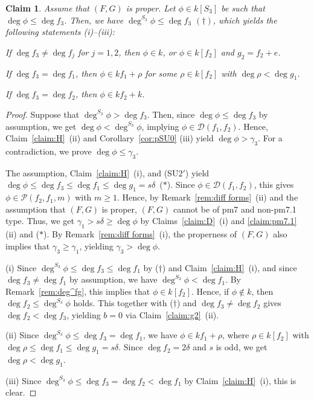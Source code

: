 \documentclass{amsart}
\theoremstyle{plain}
\newtheorem{claim}{Claim}
\theoremstyle{definition}
\newcommand{\nd}{\noindent}
\begin{document}
\begin{claim}\label{claim:S3}
Assume that $(F,G)$ is proper. 
Let $\phi \in k[S_3]$ be such that $\deg \phi \le \deg f_3$. 
Then, we have $\deg ^{S_3}\phi \le \deg f_3$ $(\dag )$, 
which yields the following statements 
{\rm (i)}--{\rm (iii):} 



\nd{\rm (i)} If $\deg f_3\ne \deg f_j$ for $j=1,2$, 
then $\phi \in k$, or 
$\phi \in k[f_2]$ and $g_2=f_2+e$. 


\nd{\rm (ii)} If $\deg f_3=\deg f_1$, 
then $\phi \in kf_1+\rho $ 
for some $\rho \in k[f_2]$ with $\deg \rho <\deg g_1$. 


\nd{\rm (iii)} If $\deg f_3=\deg f_2$, 
then $\phi \in kf_2+k$. 



\end{claim}
\begin{proof}
Suppose that $\deg ^{S_3}\phi >\deg f_3$. 
Then, since $\deg \phi \le \deg f_3$ by assumption, 
we get $\deg \phi <\deg ^{S_3}\phi $, 
implying $\phi \in \mathcal{D}(f_1,f_2)$. 
Hence, 
Claim~\ref{claim:H}~(ii) and Corollary~\ref{cor:pSU0} (iii) 
yield $\deg \phi >\gamma _3$. 
For a contradiction, 
we prove $\deg \phi \le \gamma _3$. 


The assumption, Claim~\ref{claim:H}~(i), and (SU$2'$) yield 
$\deg \phi \le \deg f_3\le \deg f_1\le \deg g_1=s\delta $~($*$). 
Since $\phi \in \mathcal{D}(f_1,f_2)$, 
this gives $\phi \in \mathcal{P}(f_2,f_1,m)$ with $m\ge 1$. 
Hence, 
by Remark~\ref{rem:diff forms}~(ii) 
and the assumption that $(F,G)$ is proper, 
$(F,G)$ cannot be of pm7 and non-pm7.1 type. 
Thus, we get $\gamma _1>s\delta \ge \deg \phi $ 
by Claims~\ref{claim:D}~(i) and \ref{claim:pm7.1} (ii) and ($*$). 
By Remark~\ref{rem:diff forms}~(i), 
the properness of $(F,G)$ also implies that $\gamma _3\ge \gamma  _1$, 
yielding $\gamma _3>\deg \phi $. 




(i) 
Since $\deg ^{S_3}\phi \le \deg f_3\le \deg f_1$ 
by ($\dag $) and Claim~\ref{claim:H}~(i), 
and since $\deg f_3\ne \deg f_1$ by assumption, 
we have $\deg ^{S_3}\phi <\deg f_1$. 
By Remark~\ref{rem:deg^fg}, 
this implies that $\phi \in k[f_2]$. 
Hence, if $\phi \not\in k$, 
then $\deg f_2\le \deg ^{S_3}\phi $ holds. 
This together with ($\dag $) and $\deg f_3\ne \deg f_2$ gives 
$\deg f_2<\deg f_3$, 
yielding $b=0$ via Claim~\ref{claim:g2}~(ii). 


(ii) 
Since $\deg ^{S_3}\phi \le \deg f_3=\deg f_1$, 
we have $\phi \in kf_1+\rho $, 
where $\rho \in k[f_2]$ with 
$\deg \rho \le \deg f_1\le \deg g_1=s\delta $. 
Since $\deg f_2=2\delta $ and $s$ is odd, 
we get $\deg \rho <\deg g_1$. 


(iii) 
Since $\deg ^{S_3}\phi \le \deg f_3=\deg f_2<\deg f_1$ 
by Claim~\ref{claim:H}~(i), 
this is clear. 
\end{proof}
\end{document}
